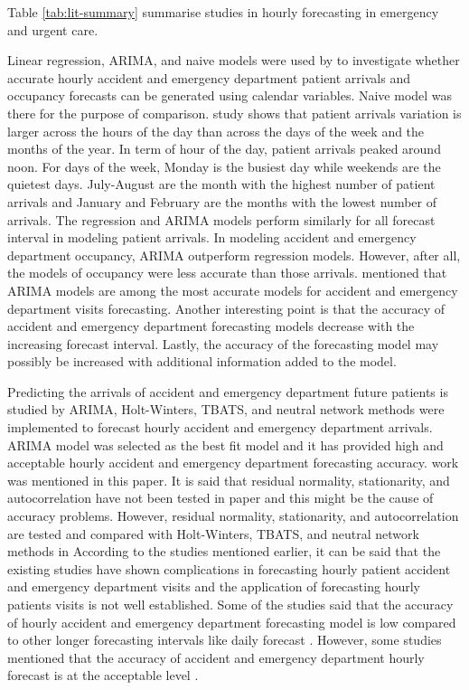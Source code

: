 \documentclass[]{elsarticle} %
\begin{document}
Table \ref{tab:lit-summary} summarise studies in hourly forecasting in emergency and urgent care.

Linear regression, ARIMA, and naive models were used by \citet{hertzum2017forecasting} to investigate whether accurate hourly accident and emergency department patient arrivals and occupancy forecasts can be generated using calendar variables. Naive model was there for the purpose of comparison. \citet{hertzum2017forecasting} study shows that patient arrivals variation is larger across the hours of the day than across the days of the week and the months of the year. In term of hour of the day, patient arrivals peaked around noon. For days of the week, Monday is the busiest day while weekends are the quietest days. July-August are the month with the highest number of patient arrivals and January and February are the months with the lowest number of arrivals. The regression and ARIMA models perform similarly for all forecast interval in modeling patient arrivals. In modeling accident and emergency department occupancy, ARIMA outperform regression models. However, after all, the models of occupancy were less accurate than those arrivals. \citet{hertzum2017forecasting} mentioned that ARIMA models are among the most accurate models for accident and emergency department visits forecasting. Another interesting point is that the accuracy of accident and emergency department forecasting models decrease with the increasing forecast interval. Lastly, the accuracy of the forecasting model may possibly be increased with additional information added to the model.

Predicting the arrivals of accident and emergency department future patients is studied by \citet{choudhury2020forecasting} ARIMA, Holt-Winters, TBATS, and neutral network methods were implemented to forecast hourly accident and emergency department arrivals. ARIMA model was selected as the best fit model and it has provided high and acceptable hourly accident and emergency department forecasting accuracy. \citet{hertzum2017forecasting} work was mentioned in this paper. It is said that residual normality, stationarity, and autocorrelation have not been tested in \citet{hertzum2017forecasting} paper and this might be the cause of accuracy problems. However, residual normality, stationarity, and autocorrelation are tested and compared with Holt-Winters, TBATS, and neutral network methods in \citet{choudhury2020forecasting}
According to the studies mentioned earlier, it can be said that the existing studies have shown complications in forecasting hourly patient accident and emergency department visits and the application of forecasting hourly patients visits is not well established. Some of the studies said that the accuracy of hourly accident and emergency department forecasting model is low compared to other longer forecasting intervals like daily forecast \citep{boyle2012predicting, hertzum2017forecasting}. However, some studies mentioned that the accuracy of accident and emergency department hourly forecast is at the acceptable level \citep{choudhury2020forecasting, mccarthy2008challenge, schweigler2009forecasting}.
\end{document}
